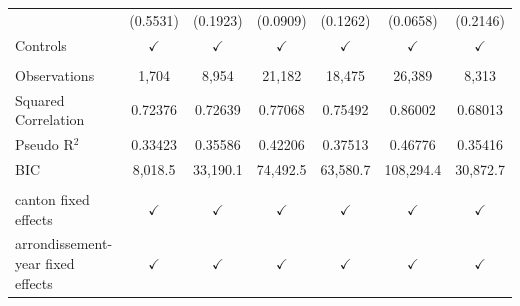 \begin{tabular}{lcccccc}
                                     & (0.5531)      & (0.1923)       & (0.0909)         & (0.1262)      & (0.0658)      & (0.2146)\\   
   Controls                          & $\checkmark$  & $\checkmark$   & $\checkmark$     & $\checkmark$  & $\checkmark$  & $\checkmark$\\   
    \\
   Observations                      & 1,704         & 8,954          & 21,182           & 18,475        & 26,389        & 8,313\\  
   Squared Correlation               & 0.72376       & 0.72639        & 0.77068          & 0.75492       & 0.86002       & 0.68013\\  
   Pseudo R$^2$                      & 0.33423       & 0.35586        & 0.42206          & 0.37513       & 0.46776       & 0.35416\\  
   BIC                               & 8,018.5       & 33,190.1       & 74,492.5         & 63,580.7      & 108,294.4     & 30,872.7\\  
    \\
   canton fixed effects              & $\checkmark$  & $\checkmark$   & $\checkmark$     & $\checkmark$  & $\checkmark$  & $\checkmark$\\   
   arrondissement-year fixed effects & $\checkmark$  & $\checkmark$   & $\checkmark$     & $\checkmark$  & $\checkmark$  & $\checkmark$\\   
   \bottomrule
\end{tabular}
\par\endgroup


